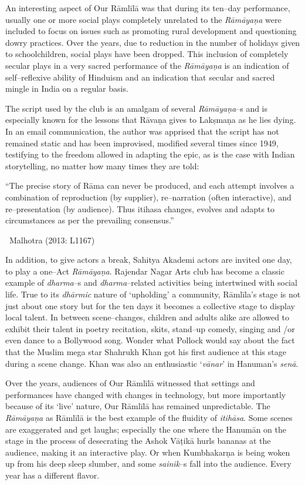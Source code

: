 An interesting aspect of Our Rāmlīlā was that during its ten–day performance, usually one or more social plays completely unrelated to the \textit{Rāmāyaṇa} were included to focus on issues such as promoting rural development and questioning dowry practices. Over the years, due to reduction in the number of holidays given to schoolchildren, social plays have been dropped. This inclusion of completely secular plays in a very sacred performance of the \textit{Rāmāyaṇa} is an indication of self–reflexive ability of Hinduism and an indication that secular and sacred mingle in India on a regular basis.

The script used by the club is an amalgam of several \textit{Rāmāyaṇa}–s and is especially known for the lessons that Rāvaṇa gives to Lakṣmaṇa as he lies dying. In an email communication, the author was apprised that the script has not remained static and has been improvised, modified several times since 1949, testifying to the freedom allowed in adapting the epic, as is the case with Indian storytelling, no matter how many times they are told:

\begin{myquote}
“The precise story of Rāma can never be produced, and each attempt involves a combination of reproduction (by supplier), re–narration (often interactive), and re–presentation (by audience). Thus itihasa changes, evolves and adapts to circumstances as per the prevailing consensus.”

~\hfill Malhotra (2013: L1167)
\end{myquote}

In addition, to give actors a break, Sahitya Akademi actors are invited one day, to play a one–Act \textit{Rāmāyaṇa}. Rajendar Nagar Arts club has become a classic example of \textit{dharma}–s and \textit{dharma}–related activities being intertwined with social life. True to its \textit{dhārmic} nature of ‘upholding’ a community, Rāmlīla’s stage is not just about one story but for the ten days it becomes a collective stage to display local talent. In between scene–changes, children and adults alike are allowed to exhibit their talent in poetry recitation, skits, stand–up comedy, singing and /or even dance to a Bollywood song. Wonder what Pollock would say about the fact that the Muslim mega star Shahrukh Khan got his first audience at this stage during a scene change. Khan was also an enthusiastic ‘\textit{vānar}’ in Hanuman’s \textit{senā}.

Over the years, audiences of Our Rāmlīlā witnessed that settings and performances have changed with changes in technology, but more importantly because of its ‘live’ nature, Our Rāmlīlā has remained unpredictable. The \textit{Rāmāyaṇa} as Rāmlīlā is the best example of the fluidity of \textit{itihāsa}. Some scenes are exaggerated and get laughs; especially the one where the Hanumān on the stage in the process of desecrating the Ashok Vāṭikā hurls bananas at the audience, making it an interactive play. Or when Kumbhakarṇa is being woken up from his deep sleep slumber, and some \textit{sainik}–s fall into the audience. Every year has a different flavor.


